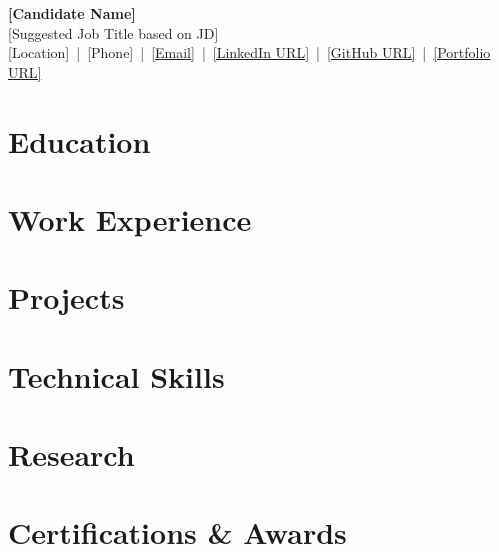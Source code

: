 \documentclass[letterpaper,11pt]{article}
\begin{document}
\begin{center}
    {\LARGE \textbf{[Candidate Name]}}\\
    {\normalsize [Suggested Job Title based on JD]}\\
    \small
    [Location] \,|\, [Phone] \,|\, \href{mailto:[Email]}{[Email]} \,|\, \href{https://[LinkedIn URL]}{[LinkedIn URL]} \,|\, \href{https://[GitHub URL]}{[GitHub URL]} \,|\, \href{https://[Portfolio URL]}{[Portfolio URL]}
\end{center}
\vspace{-13pt}


\section*{Education}

\section*{Work Experience}

\section*{Projects}

\section*{Technical Skills}

\section*{Research}

\section*{Certifications \& Awards}
\begin{itemize} \itemsep -2pt
\end{itemize}
\end{document}
